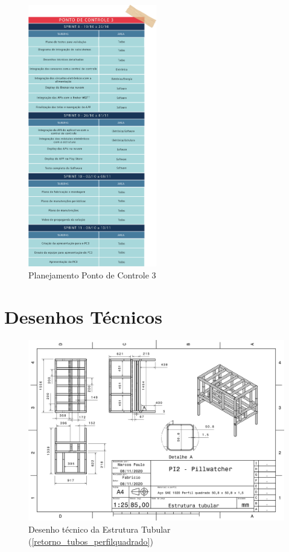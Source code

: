 \begin{apendicesenv}
\begin{figure}[H]
    \centering
    \includegraphics[width=0.5\textwidth]{figuras/gerenciamento/sprint-pc3.png}
    \caption{Planejamento Ponto de Controle 3}
    \label{fig:Sprint_pc3}
\end{figure}

\chapter{Desenhos Técnicos}\label{cad_preliminar}

\vspace{3cm}

\begin{figure}[H]
    \centering
    \includegraphics[width=1\textwidth]{figuras/estrutura/Desenhos/Estrutura_Tubular.pdf}
    \caption{Desenho técnico da Estrutura Tubular (\ref{retorno_tubos_perfilquadrado})}
    \label{fig:estruturatubular}
\end{figure}


\end{apendicesenv}
